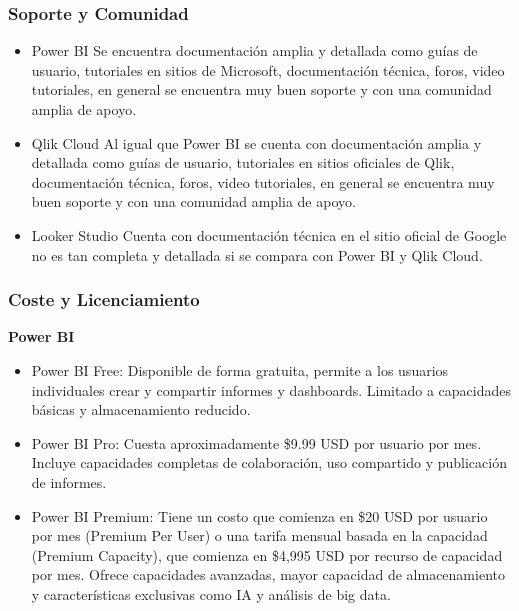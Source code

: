 \documentclass[
  11pt,
  bookmarksnumbered]{article}
\begin{document}
\hypertarget{soporte-y-comunidad}{%
\subsubsection{Soporte y Comunidad}\label{soporte-y-comunidad}}

\begin{itemize}
\item
  Power BI
  Se encuentra documentación amplia y detallada como guías de usuario, tutoriales en sitios de Microsoft, documentación técnica, foros, video tutoriales, en general se encuentra muy buen soporte y con una comunidad amplia de apoyo.
\item
  Qlik Cloud
  Al igual que Power BI se cuenta con documentación amplia y detallada como guías de usuario, tutoriales en sitios oficiales de Qlik, documentación técnica, foros, video tutoriales, en general se encuentra muy buen soporte y con una comunidad amplia de apoyo.
\item
  Looker Studio
  Cuenta con documentación técnica en el sitio oficial de Google no es tan completa y detallada si se compara con Power BI y Qlik Cloud.
\end{itemize}

\hypertarget{coste-y-licenciamiento}{%
\subsubsection{Coste y Licenciamiento}\label{coste-y-licenciamiento}}

\textbf{Power BI}

\begin{itemize}
\item
  Power BI Free: Disponible de forma gratuita, permite a los usuarios individuales crear y compartir informes y dashboards. Limitado a capacidades básicas y almacenamiento reducido.
\item
  Power BI Pro: Cuesta aproximadamente \$9.99 USD por usuario por mes. Incluye capacidades completas de colaboración, uso compartido y publicación de informes.
\item
  Power BI Premium: Tiene un costo que comienza en \$20 USD por usuario por mes (Premium Per User) o una tarifa mensual basada en la capacidad (Premium Capacity), que comienza en \$4,995 USD por recurso de capacidad por mes. Ofrece capacidades avanzadas, mayor capacidad de almacenamiento y características exclusivas como IA y análisis de big data.
\end{itemize}
\end{document}
